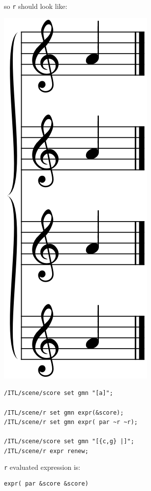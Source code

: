 \documentclass[a4paper,twoside]{report}
\newcommand{\OSC}[1]		{\texttt{#1}}
\newcommand{\lowTilde} 		{\textasciitilde}
\newcommand{\sample}	[1]			{\vspace{-2mm}\begin{center}\colorbox{mygrey}{
								\begin{minipage}[t]{0.9\columnwidth} 
								{\small \texttt{#1}}
								\end{minipage}}\end{center}}
\begin{document}
\begin{multicols}{2}
so \OSC{r} should look like:
\begin{center}
 \includegraphics[scale=0.3]{imgs/renewWithout}
\end{center}

\columnbreak

\sample{/ITL/scene/score set gmn "[a]";\\
\\
/ITL/scene/r set gmn expr(\&score);\\
/ITL/scene/r set gmn expr( par \lowTilde r \lowTilde r);\\
\\
/ITL/scene/score set gmn "[\{c,g\} |]";\\
/ITL/scene/r expr renew;
}
\OSC{r} evaluated expression is:
\begin{verbatim}
expr( par &score &score)
\end{verbatim}


\end{multicols}
\end{document}

